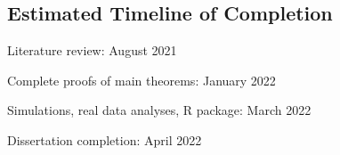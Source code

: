 \documentclass[
  11pt,
]{article}
\begin{document}
\hypertarget{estimated-timeline-of-completion}{%
\subsection{Estimated Timeline of
Completion}\label{estimated-timeline-of-completion}}

Literature review: August 2021

Complete proofs of main theorems: January 2022

Simulations, real data analyses, R package: March 2022

Dissertation completion: April 2022

\renewcommand\refname{References}
  
\end{document}
